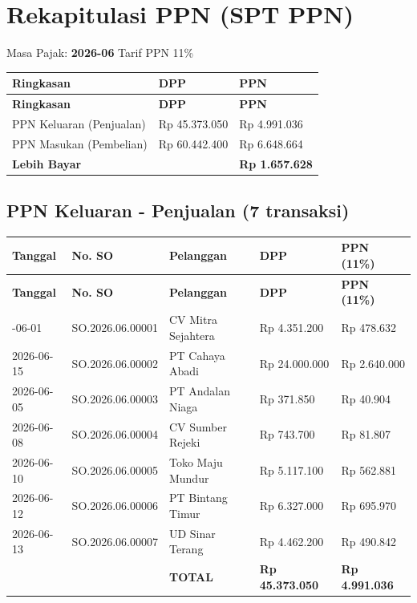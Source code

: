 \documentclass[11pt,a4paper]{article}
\begin{document}
\section{Rekapitulasi PPN (SPT PPN)}
Masa Pajak: \textbf{2026-06} \quad Tarif PPN 11\%

{\setlength{\tabcolsep}{5pt}
\begin{longtable}{l R{3.2cm} R{3.2cm}}
\toprule
\textbf{Ringkasan} & \textbf{DPP} & \textbf{PPN} \\
\midrule\endfirsthead
\toprule
\textbf{Ringkasan} & \textbf{DPP} & \textbf{PPN} \\
\midrule\endhead
\bottomrule\endfoot
PPN Keluaran (Penjualan) & Rp 45.373.050 & Rp 4.991.036 \\
PPN Masukan (Pembelian) & Rp 60.442.400 & Rp 6.648.664 \\
\textbf{Lebih Bayar} &  & \textbf{Rp 1.657.628} \\
\end{longtable}}

\subsection{PPN Keluaran - Penjualan (7 transaksi)}
{\setlength{\tabcolsep}{5pt}\small
\begin{longtable}{l l p{4cm} R{2.6cm} R{2.4cm}}
\toprule
\textbf{Tanggal} & \textbf{No. SO} & \textbf{Pelanggan} & \textbf{DPP} & \textbf{PPN (11\%)} \\
\midrule\endfirsthead
\toprule
\textbf{Tanggal} & \textbf{No. SO} & \textbf{Pelanggan} & \textbf{DPP} & \textbf{PPN (11\%)} \\
\midrule\endhead
\bottomrule{}-06-01 & SO.2026.06.00001 & CV Mitra Sejahtera & Rp 4.351.200 & Rp 478.632 \\
2026-06-15 & SO.2026.06.00002 & PT Cahaya Abadi & Rp 24.000.000 & Rp 2.640.000 \\
2026-06-05 & SO.2026.06.00003 & PT Andalan Niaga & Rp 371.850 & Rp 40.904 \\
2026-06-08 & SO.2026.06.00004 & CV Sumber Rejeki & Rp 743.700 & Rp 81.807 \\
2026-06-10 & SO.2026.06.00005 & Toko Maju Mundur & Rp 5.117.100 & Rp 562.881 \\
2026-06-12 & SO.2026.06.00006 & PT Bintang Timur & Rp 6.327.000 & Rp 695.970 \\
2026-06-13 & SO.2026.06.00007 & UD Sinar Terang & Rp 4.462.200 & Rp 490.842 \\
 &  & \textbf{TOTAL} & \textbf{Rp 45.373.050} & \textbf{Rp 4.991.036} \\
\end{longtable}}
\end{document}
